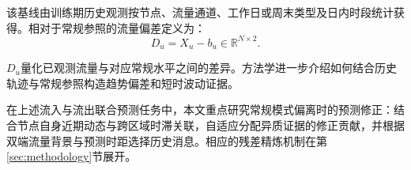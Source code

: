 该基线由训练期历史观测按节点、流量通道、工作日或周末类型及日内时段统计获得。相对于常规参照的流量偏差定义为：
\begin{equation}
\label{eq:deviation}
D_u=X_u-b_u\in\mathbb{R}^{N\times 2}.
\end{equation}

\(D_u\)量化已观测流量与对应常规水平之间的差异。方法学进一步介绍如何结合历史轨迹与常规参照构造趋势偏差和短时波动证据。

在上述流入与流出联合预测任务中，本文重点研究常规模式偏离时的预测修正：结合节点自身近期动态与跨区域时滞关联，自适应分配异质证据的修正贡献，并根据双端流量背景与预测时距选择历史消息。相应的残差精炼机制在第\ref{sec:methodology}节展开。
